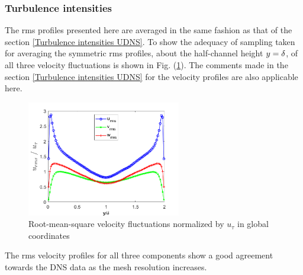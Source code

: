 \subsubsection{Turbulence intensities}
The rms profiles presented here are averaged in the same fashion as that of the section \ref{Turbulence intensities UDNS}. To show the adequacy of sampling taken for averaging the symmetric rms profiles, about the half-channel height $y  = \delta$, of all three velocity fluctuations is shown in Fig. (\ref{Turbulence intensities WALE}). The comments made in the section \ref{Turbulence intensities UDNS} for the velocity profiles are also applicable here.
%
\begin{figure}[h!]
    \centering
    \includegraphics[width=0.6\textwidth]{06_Resultsanddiscussion/figur/WALE/Turbulence intensities_Mesh2.png}
    \caption{Root-mean-square velocity fluctuations normalized by $u_\tau$ in global coordinates}
    \label{Turbulence intensities WALE}
\end{figure}
%
The rms velocity profiles for all three components show a good agreement towards the DNS data as the mesh resolution increases. 
%
